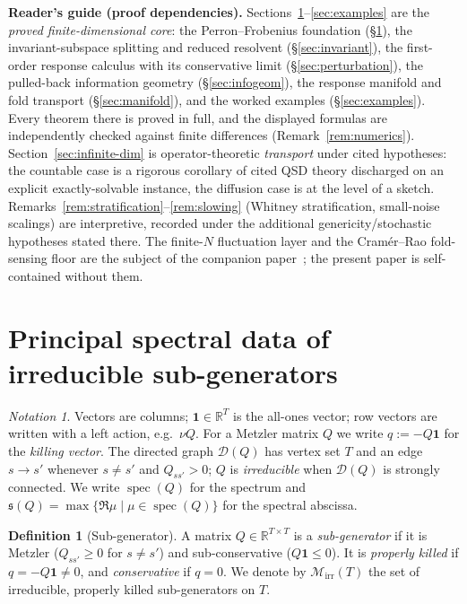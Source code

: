 \documentclass[11pt,reqno]{amsart}
\theoremstyle{plain}
\theoremstyle{definition}
\newtheorem{definition}[theorem]{Definition}
\theoremstyle{remark}
\newtheorem{notation}[theorem]{Notation}
\newcommand{\R}{\mathbb{R}}
\newcommand{\one}{\mathbf{1}}
\newcommand{\abscissa}{\mathfrak{s}}
\newcommand{\dgraph}{\mathcal{D}}
\DeclareMathOperator{\spec}{spec}
\begin{document}
\smallskip
\noindent\textbf{Reader's guide (proof dependencies).}
Sections~\ref{sec:spectral}--\ref{sec:examples} are the \emph{proved finite-dimensional core}: the
Perron--Frobenius foundation (\S\ref{sec:spectral}), the invariant-subspace splitting and reduced
resolvent (\S\ref{sec:invariant}), the first-order response calculus with its conservative limit
(\S\ref{sec:perturbation}), the pulled-back information geometry (\S\ref{sec:infogeom}), the response
manifold and fold transport (\S\ref{sec:manifold}), and the worked examples (\S\ref{sec:examples}).
Every theorem there is proved in full, and the displayed formulas are independently checked against
finite differences (Remark~\ref{rem:numerics}). Section~\ref{sec:infinite-dim} is operator-theoretic
\emph{transport} under cited hypotheses: the countable case is a rigorous corollary of cited QSD theory
discharged on an explicit exactly-solvable instance, the diffusion case is at the level of a sketch.
Remarks~\ref{rem:stratification}--\ref{rem:slowing} (Whitney stratification, small-noise scalings) are
interpretive, recorded under the additional genericity/stochastic hypotheses stated there. The
finite-$N$ fluctuation layer and the Cram\'er--Rao fold-sensing floor are the subject of the companion
paper~\cite{SarkarFoldSensing}; the present paper is self-contained without them.


\section{Principal spectral data of irreducible sub-generators}\label{sec:spectral}


\begin{notation}
Vectors are columns; $\one\in\R^{T}$ is the all-ones vector; row vectors are
written with a left action, e.g.\ $\nu Q$. For a Metzler matrix $Q$ we write
$q:=-Q\one$ for the \emph{killing vector}. The directed graph $\dgraph(Q)$ has
vertex set $T$ and an edge $s\to s'$ whenever $s\neq s'$ and $Q_{ss'}>0$; $Q$ is
\emph{irreducible} when $\dgraph(Q)$ is strongly connected. We write $\spec(Q)$
for the spectrum and $\abscissa(Q)=\max\{\Re\mu\mid\mu\in\spec(Q)\}$ for the spectral
abscissa.
\end{notation}

\begin{definition}[Sub-generator]\label{def:subgen}
A matrix $Q\in\R^{T\times T}$ is a \emph{sub-generator} if it is Metzler
($Q_{ss'}\ge0$ for $s\neq s'$) and sub-conservative ($Q\one\le 0$). It is
\emph{properly killed} if $q=-Q\one\neq 0$, and \emph{conservative} if $q=0$. We
denote by $\mathcal M_{\mathrm{irr}}(T)$ the set of irreducible, properly killed
sub-generators on $T$.
\end{definition}
\end{document}
